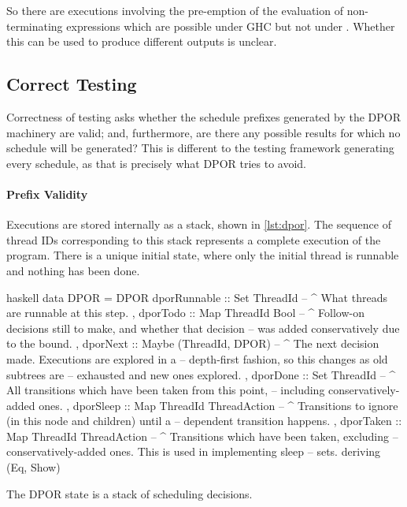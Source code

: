 So there are executions involving the pre-emption of the evaluation of
non-terminating expressions which are possible under GHC but not under
\dejafu{}.  Whether this can be used to produce different outputs is
unclear.

\subsection{Correct Testing}

Correctness of testing asks whether the schedule prefixes generated by
the DPOR machinery are valid; and, furthermore, are there any possible
results for which no schedule will be generated?  This is different to
the testing framework generating every schedule, as that is precisely
what DPOR tries to avoid.

\paragraph{Prefix Validity}
Executions are stored internally as a stack, shown in \cref{lst:dpor}.
The sequence of thread IDs corresponding to this stack represents a
complete execution of the program.  There is a unique initial state,
where only the initial thread is runnable and nothing has been done.

\begin{listing}
\centering
\begin{cminted}{haskell}
data DPOR = DPOR
  { dporRunnable :: Set ThreadId
  -- ^ What threads are runnable at this step.
  , dporTodo     :: Map ThreadId Bool
  -- ^ Follow-on decisions still to make, and whether that decision
  -- was added conservatively due to the bound.
  , dporNext     :: Maybe (ThreadId, DPOR)
  -- ^ The next decision made. Executions are explored in a
  -- depth-first fashion, so this changes as old subtrees are
  -- exhausted and new ones explored.
  , dporDone     :: Set ThreadId
  -- ^ All transitions which have been taken from this point,
  -- including conservatively-added ones.
  , dporSleep    :: Map ThreadId ThreadAction
  -- ^ Transitions to ignore (in this node and children) until a
  -- dependent transition happens.
  , dporTaken    :: Map ThreadId ThreadAction
  -- ^ Transitions which have been taken, excluding
  -- conservatively-added ones. This is used in implementing sleep
  -- sets.
  } deriving (Eq, Show)
\end{cminted}
\caption[The \dejafu{} DPOR state.]{The DPOR state is a stack of scheduling decisions.}\label{lst:dpor}
\end{listing}

